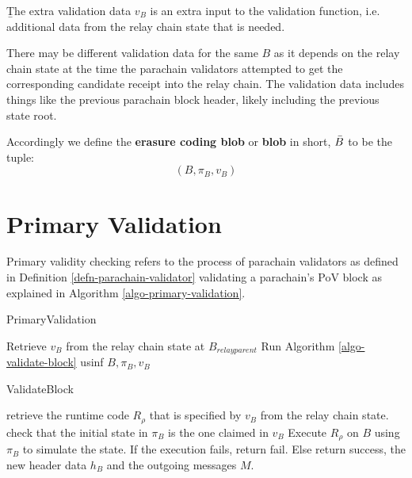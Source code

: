\begin{definition}  \label{defn-extra-validation-data}
  {\b The extra validation data} $v_B$  is an extra input to the validation function, i.e. additional data from the relay chain state that is needed.
\end{definition}

There may be different validation data for the same $B$ as it depends on the relay chain state at the time the parachain validators attempted to get the corresponding candidate receipt into the relay chain. The validation data includes things like the previous parachain block header, likely including the previous state root.

\begin{definition}
  \label{defn-blob}
  Accordingly we define the {\bf erasure coding blob} or {\bf blob} in short, {\bf $\bar{B}$} to be the tuple:
  \[
  (B, \pi_B, v_B)
  \]
\end{definition}

\section{Primary Validation}
\label{sect-primary-validation}

Primary validity checking refers to the process of parachain validators as defined in Definition \ref{defn-parachain-validator} validating a parachain's PoV block as explained in Algorithm \ref{algo-primary-validation}.

\begin{algorithm}
  \caption[]{\sc PrimaryValidation}
  \label{algo-primary-validation}
  \begin{algorithmic}[1]
    
    \State Retrieve $v_B$ from the relay chain state at $B_{relay parent}$
    \State Run Algorithm \ref{algo-validate-block} usinf $B, \pi_B, v_B$
  \end{algorithmic}
\end{algorithm}

\begin{algorithm}
  \caption[]{\sc ValidateBlock}
  \label{algo-validate-block}
  \begin{algorithmic}[1]
    \State retrieve the runtime code $R_\rho$ that is specified by $v_B$ from the relay chain state.
    \State check that the initial state in $\pi_B$ is the one claimed in $v_B$
    \State Execute $R_\rho$ on $B$ using $\pi_B$ to simulate the state.    
    \State If the execution fails, return fail.
    \State Else return success, the new header data $h_B$ and the outgoing messages $M$.
  \end{algorithmic}
\end{algorithm}

